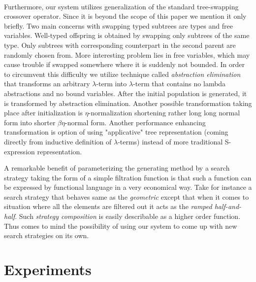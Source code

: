 \documentclass[conference]{IEEEtran}
\newcommand{\lterm}{$\lambda$-term\xspace}
\newcommand{\lterms}{$\lambda$-terms\xspace}
\begin{document}
~\\
Furthermore, our system utilizes generalization of the standard 
tree-swapping crossover operator. Since it is beyond the scope of this 
paper we mention it only briefly. Two main concerns with swapping typed 
subtrees are types and free variables. Well-typed offspring is obtained 
by swapping only subtrees of the same type. Only subtrees with 
corresponding counterpart in the second parent are randomly chosen from.
More interesting problem lies in free variables, which may cause trouble
if swapped somewhere where it is suddenly not bounded. In order to circumvent this
difficulty we utilize technique called \textit{abstraction elimination}\cite{jones87}
that transforms an arbitrary \lterm into \lterm that contains no lambda abstractions
and no bound variables. After the initial population is generated,  it is transformed
by abstraction elimination. Another possible transformation taking place
after initialization is $\eta$-normalization shortening 
rather long long normal form into shorter $\beta\eta$-normal form.  
Another performance enhancing transformation is option of using "applicative" tree representation (coming directly from inductive definition of \lterms) instead of more traditional S-expression representation.

A remarkable benefit of parameterizing the generating method 
by a search strategy taking the form of a simple filtration function
is that such a function can be expressed by functional language in a very 
economical way. Take for instance a search strategy that behaves same
as the \textit{geometric} except that when it comes to 
situation where all the elements are filtered out it
acts as the \textit{ramped half-and-half}. 
Such \textit{strategy composition}
is easily describable as a higher order function. Thus comes 
to mind the possibility of using our system to come up with new
search strategies on its own.

\section{Experiments}
\label{experiments}
\end{document}
